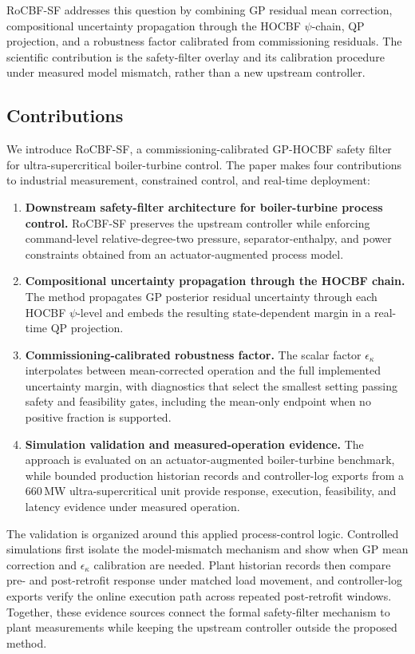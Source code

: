 RoCBF-SF addresses this question by combining GP residual mean correction, compositional uncertainty propagation through the HOCBF $\psi$-chain, QP projection, and a robustness factor calibrated from commissioning residuals. The scientific contribution is the safety-filter overlay and its calibration procedure under measured model mismatch, rather than a new upstream controller.

\subsection{Contributions}

We introduce RoCBF-SF, a commissioning-calibrated GP-HOCBF safety filter for ultra-supercritical boiler-turbine control. The paper makes four contributions to industrial measurement, constrained control, and real-time deployment:

\begin{enumerate}
    \item \textbf{Downstream safety-filter architecture for boiler-turbine process control.} RoCBF-SF preserves the upstream controller while enforcing command-level relative-degree-two pressure, separator-enthalpy, and power constraints obtained from an actuator-augmented process model.

    \item \textbf{Compositional uncertainty propagation through the HOCBF chain.} The method propagates GP posterior residual uncertainty through each HOCBF $\psi$-level and embeds the resulting state-dependent margin in a real-time QP projection.

    \item \textbf{Commissioning-calibrated robustness factor.} The scalar factor $\epsilon_\kappa$ interpolates between mean-corrected operation and the full implemented uncertainty margin, with diagnostics that select the smallest setting passing safety and feasibility gates, including the mean-only endpoint when no positive fraction is supported.

    \item \textbf{Simulation validation and measured-operation evidence.} The approach is evaluated on an actuator-augmented boiler-turbine benchmark, while bounded production historian records and controller-log exports from a 660\,MW ultra-supercritical unit provide response, execution, feasibility, and latency evidence under measured operation.
\end{enumerate}

The validation is organized around this applied process-control logic. Controlled simulations first isolate the model-mismatch mechanism and show when GP mean correction and $\epsilon_\kappa$ calibration are needed. Plant historian records then compare pre- and post-retrofit response under matched load movement, and controller-log exports verify the online execution path across repeated post-retrofit windows. Together, these evidence sources connect the formal safety-filter mechanism to plant measurements while keeping the upstream controller outside the proposed method.
